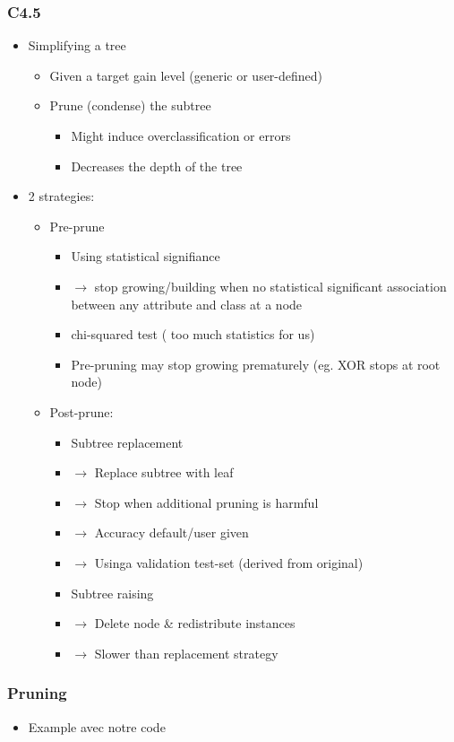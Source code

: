 \begin{frame}[allowframebreaks]
\frametitle{C4.5}
\begin{itemize}
\item Simplifying a tree
\vfill
\begin{itemize}
\item Given a target gain level (generic or user-defined)
\vfill
\item Prune (condense) the subtree
\vfill
\begin{itemize}
\item Might induce overclassification or errors
\vfill
\item Decreases the depth of the tree 
\vfill
\end{itemize}
\end{itemize}
\item 2 strategies:
\vfill
\begin{itemize}
\item Pre-prune
\vfill
\begin{itemize}
\item Using statistical signifiance
\vfill
\item $\rightarrow$ stop growing/building when no statistical significant association between any attribute and class at a node
\vfill
\item chi-squared test ( too much statistics for us)
\vfill
\item Pre-pruning may stop growing prematurely (eg. XOR stops at root node)
\vfill
\end{itemize}
\framebreak
\item Post-prune:
\begin{itemize}
\item Subtree replacement
\item $\rightarrow$ Replace subtree with leaf
\item $\rightarrow$ Stop when additional pruning is harmful
\item $\rightarrow$ Accuracy default/user given
\item $\rightarrow$ Usinga validation test-set (derived from original)
\item Subtree raising
\item $\rightarrow$ Delete node \& redistribute instances
\item $\rightarrow$ Slower than replacement strategy
\end{itemize}
\end{itemize}
\end{itemize}


\end{frame}


\begin{frame}
\frametitle{Pruning}
\begin{itemize}
\item Example avec notre code
\end{itemize}
\end{frame}